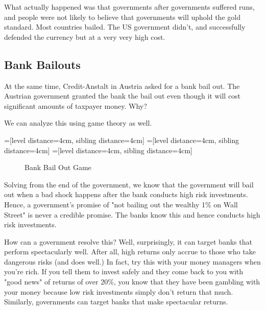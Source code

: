 \documentclass[11pt]{scrartcl}
\begin{document}
What actually happened was that governments after governments suffered runs, and people were not likely to believe that governments will uphold the gold standard. Most countries bailed. The US government didn't, and successfully defended the currency but at a very very high cost.

\subsection{Bank Bailouts}

At the same time, Credit-Anstalt in Austria asked for a bank bail out. The Austrian government granted the bank the bail out even though it will cost significant amounts of taxpayer money. Why?

We can analyze this using game theory as well.

=[level distance=4cm, sibling distance=4cm]
=[level distance=4cm, sibling distance=4cm]
=[level distance=4cm, sibling distance=4cm]

\begin{figure}[H] 
\centering
{}
\caption{Bank Bail Out Game}
\end{figure}

Solving from the end of the government, we know that the government will bail out when a bad shock happens after the bank conducts high risk investments. Hence, a government's promise of "not bailing out the wealthy 1\% on Wall Street" is never a credible promise. The banks know this and hence conducts high risk investments. 

How can a government resolve this? Well, surprisingly, it can target banks that perform spectacularly well. After all, high returns only accrue to those who take dangerous risks (and does well.) In fact, try this with your money managers when you're rich. If you tell them to invest safely and they come back to you with "good news" of returns of over 20\%, you know that they have been gambling with your money because low risk investments simply don't return that much. Similarly, governments can target banks that make spectacular returns.
\end{document}
